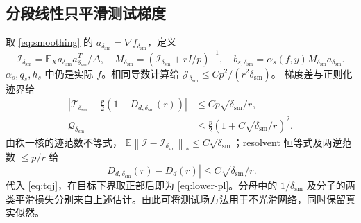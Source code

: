 \documentclass[a4paper]{tufte-handout}
\newcommand{\E}{\mathbb E}
\newcommand{\I}{\mathcal I}
\newcommand{\dsm}{\delta_{\mathrm{sm}}}
\newcommand{\norm}[1]{\left\|#1\right\|}
\begin{document}
\begin{fullwidth}
\subsection{分段线性只平滑测试梯度}
取 \eqref{eq:smoothing} 的 $a_{\dsm}=\nabla f_{\dsm}$，定义
\[
\I_{\dsm}=\E_Xa_{\dsm} a_{\dsm}^T/\Delta,
\quad M_{\dsm}=(\I_{\dsm}+rI/p)^{-1},
\quad b_{s,\dsm}=\alpha_s(f,y)M_{\dsm} a_{\dsm}.
\]
$\alpha_s,q_s,h_s$ 中仍是实际 $f$。相同导数计算给
$\mathcal J_{\dsm}\le Cp^2/(r^2\dsm)$。
梯度差与正则化迹界给
\begin{equation}\begin{aligned}
|\mathcal T_{\dsm}-\tfrac p2(1-D_{d,\dsm}(r))|
&\le Cp\sqrt{\dsm/r},\\
\mathcal Q_{\dsm}&\le\tfrac p2(1+C\sqrt{\dsm/r})^2.
\end{aligned}\end{equation}
由秩一核的迹范数不等式，
$\E\norm{\I-\I_{\dsm}}_*\le C\sqrt{\dsm}$；resolvent 恒等式及两逆范数 $\le p/r$ 给
\[
|D_{d,\dsm}(r)-D_d(r)|\le C\sqrt{\dsm}/r.
\]
代入 \eqref{eq:tqj}，在目标下界取正部后即为 \eqref{eq:lower-pl}。分母中的 $1/\dsm$ 及分子的两类平滑损失分别来自上述估计。由此可将测试场方法用于不光滑网络，同时保留真实似然。


\end{fullwidth}
\end{document}
